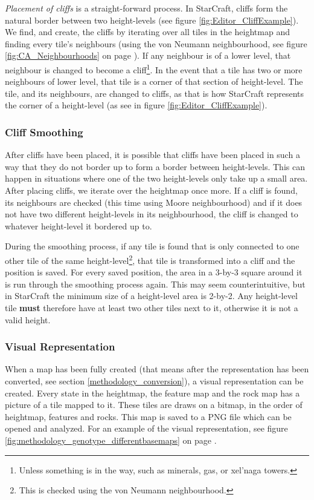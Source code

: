 \textit{Placement of cliffs} is a straight-forward process. In StarCraft, cliffs form the natural border between two height-levels (see figure \ref{fig:Editor_CliffExample}). We find, and create, the cliffs by iterating over all tiles in the heightmap and finding every tile's neighbours (using the von Neumann neighbourhood, see figure \ref{fig:CA_Neighbourhoods} on page \pageref{fig:CA_Neighbourhoods}). If any neighbour is of a lower level, that neighbour is changed to become a cliff\footnote{Unless something is in the way, such as minerals, gas, or xel'naga towers.}. In the event that a tile has two or more neighbours of lower level, that tile is a corner of that section of height-level. The tile, and its neighbours, are changed to cliffs, as that is how StarCraft represents the corner of a height-level (as see in figure \ref{fig:Editor_CliffExample}).


\subsubsection{Cliff Smoothing}

After cliffs have been placed, it is possible that cliffs have been placed in such a way that they do not border up to form a border between height-levels. This can happen in situations where one of the two height-levels only take up a small area. After placing cliffs, we iterate over the heightmap once more. If a cliff is found, its neighbours are checked (this time using Moore neighbourhood) and if it does not have two different height-levels in its neighbourhood, the cliff is changed to whatever height-level it bordered up to. 

During the smoothing process, if any tile is found that is only connected to one other tile of the same height-level\footnote{This is checked using the von Neumann neighbourhood.}, that tile is transformed into a cliff and the position is saved. For every saved position, the area in a 3-by-3 square around it is run through the smoothing process again. This may seem counterintuitive, but in StarCraft the minimum size of a height-level area is 2-by-2. Any height-level tile \textbf{must} therefore have at least two other tiles next to it, otherwise it is not a valid height.

\subsubsection{Visual Representation}
When a map has been fully created (that means after the representation has been converted, see section \ref{methodology_conversion}), a visual representation can be created. Every state in the heightmap, the feature map and the rock map has a picture of a tile mapped to it. These tiles are draws on a bitmap, in the order of heightmap, features and rocks. This map is saved to a PNG file which can be opened and analyzed. For an example of the visual representation, see figure \ref{fig:methodology_genotype_differentbasemaps} on page \pageref{fig:methodology_genotype_differentbasemaps}.

